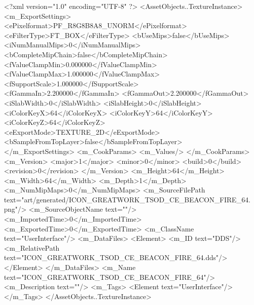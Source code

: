 <?xml version="1.0" encoding="UTF-8" ?>
<AssetObjects..TextureInstance>
	<m_ExportSettings>
		<ePixelformat>PF_R8G8B8A8_UNORM</ePixelformat>
		<eFilterType>FT_BOX</eFilterType>
		<bUseMips>false</bUseMips>
		<iNumManualMips>0</iNumManualMips>
		<bCompleteMipChain>false</bCompleteMipChain>
		<fValueClampMin>0.000000</fValueClampMin>
		<fValueClampMax>1.000000</fValueClampMax>
		<fSupportScale>1.000000</fSupportScale>
		<fGammaIn>2.200000</fGammaIn>
		<fGammaOut>2.200000</fGammaOut>
		<iSlabWidth>0</iSlabWidth>
		<iSlabHeight>0</iSlabHeight>
		<iColorKeyX>64</iColorKeyX>
		<iColorKeyY>64</iColorKeyY>
		<iColorKeyZ>64</iColorKeyZ>
		<eExportMode>TEXTURE_2D</eExportMode>
		<bSampleFromTopLayer>false</bSampleFromTopLayer>
	</m_ExportSettings>
	<m_CookParams>
		<m_Values/>
	</m_CookParams>
	<m_Version>
		<major>1</major>
		<minor>0</minor>
		<build>0</build>
		<revision>0</revision>
	</m_Version>
	<m_Height>64</m_Height>
	<m_Width>64</m_Width>
	<m_Depth>1</m_Depth>
	<m_NumMipMaps>0</m_NumMipMaps>
	<m_SourceFilePath text="art/generated/ICON_GREATWORK_TSOD_CE_BEACON_FIRE_64.png"/>
	<m_SourceObjectName text=""/>
	<m_ImportedTime>0</m_ImportedTime>
	<m_ExportedTime>0</m_ExportedTime>
	<m_ClassName text="UserInterface"/>
	<m_DataFiles>
		<Element>
			<m_ID text="DDS"/>
			<m_RelativePath text="ICON_GREATWORK_TSOD_CE_BEACON_FIRE_64.dds"/>
		</Element>
	</m_DataFiles>
	<m_Name text="ICON_GREATWORK_TSOD_CE_BEACON_FIRE_64"/>
	<m_Description text=""/>
	<m_Tags>
		<Element text="UserInterface"/>
	</m_Tags>
</AssetObjects..TextureInstance>
